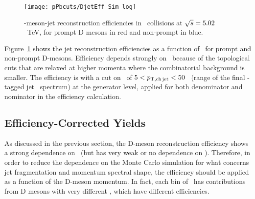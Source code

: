 \begin{figure}[bth]
\centering
\texttt{[image: pPbcuts/DjetEff\_Sim\_log]}
\caption{\Dzero-meson-jet reconstruction efficiencies in \pp\ collisions at $\sqrt{s}=5.02$~TeV, for prompt D mesons in red and non-prompt in blue.}
\label{fig:eq_pp_DrecEff}
\end{figure}

Figure~\ref{fig:eq_pp_DrecEff} shows the \Dzero\-jet reconstruction efficiencies as a function of \ptd\, 
for prompt and non-prompt D-mesons. Efficiency depends strongly on \ptd\ because of the topological cuts that are relaxed at higher momenta where the combinatorial background is smaller. 
The efficiency is with a cut on \ptchjet\ of $5 < p_{\mathrm{T,ch\, jet}} < 50$ \GeVc\ (range of the final \Dzero-tagged jet \pt\ spectrum) at the generator level, applied for both denominator and nominator in the efficiency calculation.


\subsection{Efficiency-Corrected Yields}

As discussed in the previous section, the D-meson reconstruction efficiency shows a strong dependence on \ptd\ (but has very weak or no dependence on \ptjet).
Therefore, in order to reduce the dependence on the Monte Carlo simulation for what concerns jet fragmentation and momentum spectral shape,
the efficiency should be applied as a function of the D-meson momentum. In fact, each bin of \ptjet\ has contributions from D mesons with very different \ptd, which have different efficiencies.

